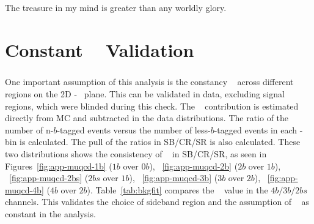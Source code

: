 \begin{savequote}[75mm]
The treasure in my mind is greater than any worldly glory.   
\end{savequote}
\chapter{Constant \muqcd~ Validation}
\label{AppendixMuqcd}

\paragraph{}
One important assumption of this analysis is the constancy \muqcd~ across different regions on the 2D \mleadJ-\msublJ~ plane. 
This can be validated in data, excluding signal regions, which were blinded during this check. 
The \ttbar~ contribution is estimated directly from MC and subtracted in the data distributions. 
The ratio of the number of n-$b$-tagged events versus the number of less-$b$-tagged events in each \mleadJ-\msublJ bin is calculated.
The pull of the ratios in SB/CR/SR is also calculated.
These two distributions shows the consistency of \muqcd~ in SB/CR/SR, as seen in Figures~\ref{fig:app-muqcd-1b} ($1b$ over $0b$), ~\ref{fig:app-muqcd-2b} ($2b$ over $1b$), ~\ref{fig:app-muqcd-2bs} ($2bs$ over $1b$), ~\ref{fig:app-muqcd-3b} ($3b$ over $2b$), ~\ref{fig:app-muqcd-4b} ($4b$ over $2b$). 
Table~\ref{tab:bkgfit} compares the \muqcd~ value in the $4b/3b/2bs$ channels.
This validates the choice of sideband region and the assumption of \muqcd~ as constant in the analysis.



